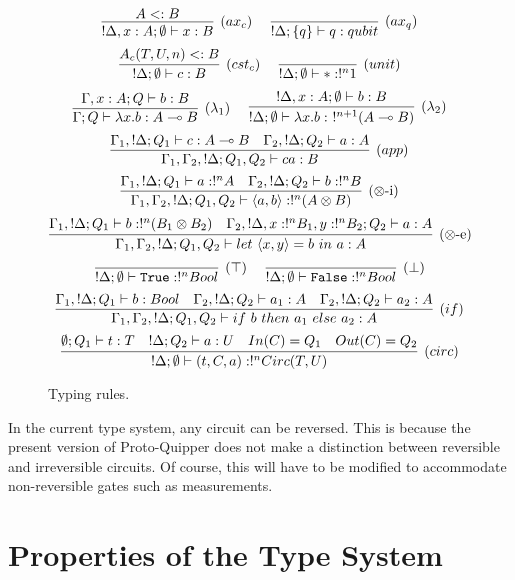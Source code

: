 \documentclass{article}
\begin{document}
\begin{figure}[!ht]
\begin{mdframed}
\[
\infer[(ax_c)]{!\Delta, x:A;\emptyset\entails x:B}{
  A<:B
}
~~~~
\infer[(ax_q)]{!\Delta;\s{q}\entails q:qubit}{
} 
\]
\[
\infer[(cst_c)]{!\Delta;\emptyset \entails c:B}{
  A_{c}(T,U,n)<:B
} 
~~~~
\infer[(unit)]{!\Delta;\emptyset\entails *:!^n 1}{
}
\]
\[
\infer[(\lambda_1)]{\Gamma;Q\entails \lambda x.b:A\loli B}{
  \Gamma,x:A;Q \entails b:B
}
~~~~
\infer[(\lambda_2)]{!\Delta;\emptyset \entails \lambda x.b:~!^{n+1}(A\loli B)}{
  !\Delta, x:A;\emptyset \entails b:B
}
\]
\[
\infer[(app)]{\Gamma_1,\Gamma_2, !\Delta;Q_1,Q_2\entails ca:B}{
  \Gamma_1, !\Delta;Q_1\entails c:A\loli B 
  &
  \Gamma_2, !\Delta ;Q_2\entails a:A 
}
\]
\[
\infer[(\x\mbox{-i})]{\Gamma_1,\Gamma_2, !\Delta;Q_1,Q_2\entails \atuple{a,b}:!^n(A\x B)}{
  \Gamma_1, !\Delta;Q_1\entails a:!^nA 
  &
  \Gamma_2, !\Delta ;Q_2\entails b:!^nB
}
\]
\[
\infer[(\x\mbox{-e})]{\Gamma_1,\Gamma_2, !\Delta;Q_1,Q_2\entails let ~\atuple{x,y}=b~in~a:A}{
  \Gamma_1, !\Delta;Q_1\entails b:!^n(B_1\x B_2) 
  &
  \Gamma_2, !\Delta, x:!^nB_1, y:!^nB_2 ;Q_2\entails a:A
}
\]
\[
\infer[(\top)]{!\Delta;\emptyset\entails \true:!^n Bool}{
} 
~~~~
\infer[(\bot)]{!\Delta;\emptyset\entails \false:!^n Bool}{
}
\]
\[
\infer[(if)]{\Gamma_1,\Gamma_2, !\Delta;Q_1,Q_2\entails if ~b~ then ~a_1~ else ~a_2:A}{
  \Gamma_1, !\Delta;Q_1\entails b:Bool 
  &
  \Gamma_2, !\Delta;Q_2 \entails a_1:A ~~~ \Gamma_2, !\Delta;Q_2 \entails a_2:A
}
\]
\[
\infer[(circ)]{!\Delta;\emptyset \entails (t,C,a):!^nCirc(T,U)}{
  \emptyset ; Q_1\entails t:T 
  &
  !\Delta ; Q_2\entails a:U 
  &
  In(C)=Q_1 
  &
  Out(C)=Q_2
}
\]
\end{mdframed}
\caption{Typing rules.}
\label{typing_rules}
\end{figure}

In the current type system, any circuit can be reversed. 
This is because the present version of Proto-Quipper does not 
make a distinction between reversible and irreversible circuits. 
Of course, this will have to be modified to accommodate non-reversible 
gates such as measurements.


\section{Properties of the Type System}
\end{document}
